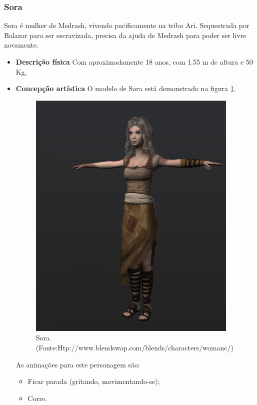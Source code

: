 \subsubsection{Sora}
Sora é mulher de Medrash, vivendo pacificamente na tribo Ari. Sequestrada
 por Balazar para ser escravizada, precisa da ajuda de Medrash para poder
 ser livre novamente.
\begin{itemize}
\item {\bf Descrição física}
Com aproximadamente 18 anos, com 1.55 m de altura e 50 Kg, 
\item {\bf Concepção artística}
O modelo de Sora está demonstrado na figura \ref{img:sora}.

\begin{figure}[H]
 \centering
 \includegraphics[scale=0.8]{Imagens/sora01.png}
 \caption{Sora.(Fonte:Htp://www.blendswap.com/blends/characters/womanc/)}
\label{img:sora}
\end{figure}


As animações para este personagem são:
\begin{itemize}
\item Ficar parada (gritando, movimentando-se);
\item Corre.
\end{itemize}
\end{itemize}

